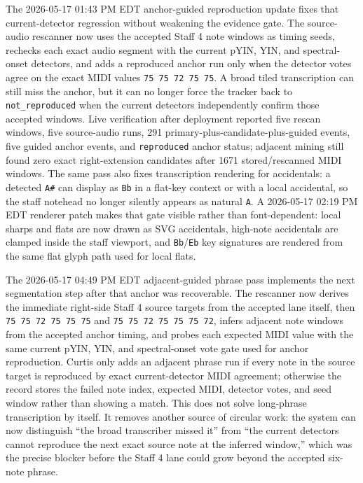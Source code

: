 \documentclass[12pt,letterpaper]{article}
\begin{document}
The 2026-05-17 01:43 PM EDT anchor-guided reproduction update fixes that current-detector regression without weakening the evidence gate. The source-audio rescanner now uses the accepted Staff 4 note windows as timing seeds, rechecks each exact audio segment with the current pYIN, YIN, and spectral-onset detectors, and adds a reproduced anchor run only when the detector votes agree on the exact MIDI values \texttt{75 75 72 75 75}. A broad tiled transcription can still miss the anchor, but it can no longer force the tracker back to \texttt{not\_reproduced} when the current detectors independently confirm those accepted windows. Live verification after deployment reported five rescan windows, five source-audio runs, 291 primary-plus-candidate-plus-guided events, five guided anchor events, and \texttt{reproduced} anchor status; adjacent mining still found zero exact right-extension candidates after 1671 stored/rescanned MIDI windows. The same pass also fixes transcription rendering for accidentals: a detected \texttt{A\#} can display as \texttt{Bb} in a flat-key context or with a local accidental, so the staff notehead no longer silently appears as natural \texttt{A}. A 2026-05-17 02:19 PM EDT renderer patch makes that gate visible rather than font-dependent: local sharps and flats are now drawn as SVG accidentals, high-note accidentals are clamped inside the staff viewport, and \texttt{Bb}/\texttt{Eb} key signatures are rendered from the same flat glyph path used for local flats.

The 2026-05-17 04:49 PM EDT adjacent-guided phrase pass implements the next segmentation step after that anchor was recoverable. The rescanner now derives the immediate right-side Staff 4 source targets from the accepted lane itself, then \texttt{75 75 72 75 75 75} and \texttt{75 75 72 75 75 75 72}, infers adjacent note windows from the accepted anchor timing, and probes each expected MIDI value with the same current pYIN, YIN, and spectral-onset vote gate used for anchor reproduction. Curtis only adds an adjacent phrase run if every note in the source target is reproduced by exact current-detector MIDI agreement; otherwise the record stores the failed note index, expected MIDI, detector votes, and seed window rather than showing a match. This does not solve long-phrase transcription by itself. It removes another source of circular work: the system can now distinguish ``the broad transcriber missed it'' from ``the current detectors cannot reproduce the next exact source note at the inferred window,'' which was the precise blocker before the Staff 4 lane could grow beyond the accepted six-note phrase.
\end{document}
